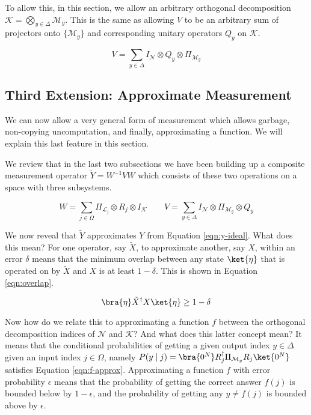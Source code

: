 \documentclass{article}
\theoremstyle{definition} \newtheorem{lemma}{Lemma}
\theoremstyle{definition} \newtheorem{theorem}{Theorem}
\begin{document}
To allow this, in this section, we allow an arbitrary orthogonal decomposition
$\mathcal{K} = \bigotimes_{y \in \Delta} \mathcal{M}_y$. This is the same as
allowing $V$ to be an arbitrary sum of projectors onto $\{\mathcal{M}_y\}$
and corresponding unitary operators $Q_y$ on $\mathcal{K}$.

\begin{equation}
V = \sum_{y \in \Delta} I_{\mathcal{N}} \otimes Q_y \otimes \Pi_{\mathcal{M}_y}
\end{equation}

\subsection{Third Extension: Approximate Measurement}
\label{subsec:approx}

We can now allow a very general form of
measurement which allows garbage, non-copying uncomputation, and finally,
approximating a function. We will explain this last feature in this section.

We review that in the last two subsections we have been building up a
composite measurement operator $\tilde{Y} = W^{-1}VW$ which consists of 
these two operations on a space with three subsystems.

\begin{equation}
W = \sum_{j \in \Omega} \Pi_{\mathcal{L}_j} \otimes R_j \otimes I_{\mathcal{K}} \qquad
V = \sum_{y \in \Delta} I_{\mathcal{N}} \otimes \Pi_{\mathcal{M}_y} \otimes Q_y
\end{equation}

We now reveal that $\tilde{Y}$ approximates $Y$ from Equation \ref{eqn:y-ideal}.
What does this mean? For one operator, say $\tilde{X}$, to approximate another,
say $X$, within an error $\delta$ means that the minimum overlap between
any state $\ket{\eta}$ that is operated on by $\tilde{X}$ and $X$ is at least
$1 - \delta$. This is shown in Equation \ref{eqn:overlap}.

\begin{equation}
\bra{\eta} \tilde{X}^{\dagger} X \ket{\eta} \ge 1 - \delta
\end{equation}

Now how do we relate this to approximating a function
$f$ between the orthogonal decomposition indices of $\mathcal{N}$ and 
$\mathcal{K}$? And what does this latter concept mean?
It means that the conditional probabilities of
getting a given output index $y \in \Delta$ given an input index $j \in \Omega$,
namely $P(y \mid j) = \bra{0^N} R^{\dagger}_j \Pi_{\mathcal{M}_y} R_j \ket{0^N}$
satisfies Equation \ref{eqn:f-approx}. Approximating a function $f$ with
error probability $\epsilon$ means that the probability of getting the
correct answer $f(j)$ is bounded below by $1 - \epsilon$, and the probability
of getting any $y \ne f(j)$ is bounded above by $\epsilon$.
\end{document}
